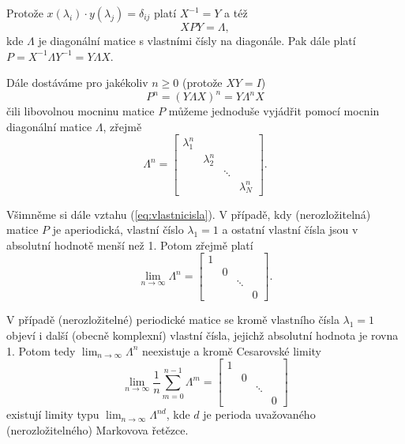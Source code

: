 \documentclass[10pt]{article}
\begin{document}
Protože $x(\lambda_i) \cdot y(\lambda_j) = \delta_{ij}$ platí $X^{-1} =  Y$ a též $$XPY = \Lambda,$$ kde $\Lambda$ je diagonální matice s vlastními čísly na diagonále. Pak dále platí $P = X^{-1} \Lambda Y^{-1} = Y \Lambda X$.

Dále dostáváme pro jakékoliv $n \geq 0$ (protože $XY=I$)
\begin{equation}
\label{eq:vlastnicisla}
P^n = (Y \Lambda X)^n = Y \Lambda^n X
\end{equation}
čili libovolnou mocninu matice $P$ můžeme jednoduše vyjádřit pomocí mocnin diagonální matice $\Lambda$, zřejmě $$\Lambda^n = \begin{bmatrix}
\lambda_1^n&&&\\
&\lambda_2^n&&\\
&&\ddots&\\
&&&\lambda_N^n
\end{bmatrix}.$$

Všimněme si dále vztahu (\ref{eq:vlastnicisla}). V případě, kdy (nerozložitelná) matice $P$ je aperiodická, vlastní číslo $\lambda_1 = 1$ a ostatní vlastní čísla jsou v absolutní hodnotě menší než 1. Potom zřejmě platí $$\lim_{n \to \infty} \Lambda^n = \begin{bmatrix}
1&&&\\
&0&&\\
&&\ddots&\\
&&&0
\end{bmatrix}.$$

V případě (nerozložitelné) periodické matice se kromě vlastního čísla $\lambda_1 =1$ objeví i další (obecně komplexní) vlastní čísla, jejichž absolutní hodnota je rovna 1. Potom tedy $\lim_{n \to \infty} \Lambda^n$ neexistuje a kromě Cesarovské limity $$\lim_{n \to \infty} \frac{1}{n} \sum_{m=0}^{n-1} \Lambda^m = \begin{bmatrix}
1&&&\\
&0&&\\
&&\ddots&\\
&&&0
\end{bmatrix}$$ existují limity typu $\lim_{n \to \infty} \Lambda^{nd}$, kde $d$ je perioda uvažovaného (nerozložitelného) Markovova řetězce.
\end{document}
